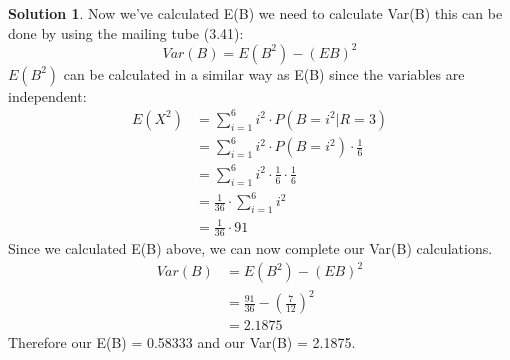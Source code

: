 \documentclass[paper=a4, fontsize=11pt]{scrartcl} %
\numberwithin{equation}{section} %
\numberwithin{figure}{section} %
\numberwithin{table}{section} %
\theoremstyle{definition}
\newtheorem*{solution}{Solution}
\begin{document}
\begin{solution}
    Now we've calculated E(B) we need to calculate Var(B) this can be done by using the mailing tube (3.41):
    \begin{equation*}
        Var(B) = E(B^2) - (EB)^2
    \end{equation*}
     $E(B^2)$ can be calculated in a similar way as E(B) since the variables are independent:
    \begin{equation*}
        \begin{split}
            E(X^2) &= \sum_{i=1}^6 i^2 \cdot P(B=i^2 | R=3)
            \\&= \sum_{i=1}^6 i^2 \cdot P(B=i^2) \cdot \frac{1}{6}
            \\&= \sum_{i=1}^6 i^2 \cdot \frac{1}{6} \cdot \frac{1}{6}
            \\&= \frac{1}{36} \cdot \sum_{i=1}^6 i^2
            \\&= \frac{1}{36} \cdot 91
        \end{split}
    \end{equation*}
    Since we calculated E(B) above, we can now complete our Var(B) calculations.
    \begin{equation*}
        \begin{split}
            Var(B) &= E(B^2) - (EB)^2
            \\&= \frac{91}{36} - (\frac{7}{12})^2
            \\&= 2.1875
        \end{split}
    \end{equation*}
    Therefore our E(B) = 0.58333 and our Var(B) = 2.1875.
    \end{solution}
    
\end{document}
